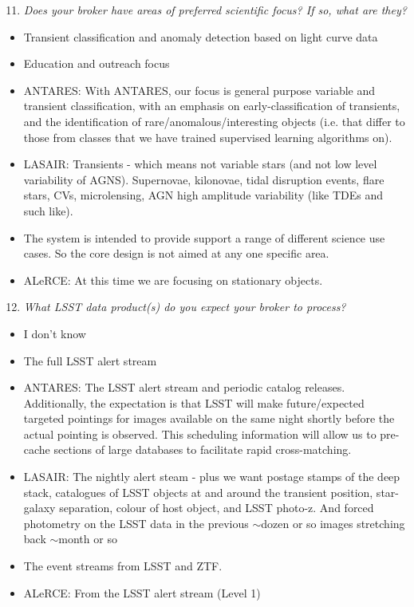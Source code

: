 \documentclass{article}
\begin{document}
\begin{enumerate}
\setcounter{enumi}{10}
\item {\em Does your broker have areas of preferred scientific focus? If so, what are they? }
\end{enumerate}

\begin{itemize}
\item Transient classification and anomaly detection based on light curve data
\item Education and outreach focus
\item ANTARES: With ANTARES, our focus is general purpose variable and transient classification, with an emphasis on early-classification of transients, and the identification of rare/anomalous/interesting objects (i.e. that differ to those from classes that we have trained supervised learning algorithms on).
\item LASAIR: Transients - which means not variable stars (and not low level variability of AGNS). Supernovae, kilonovae, tidal disruption events, flare stars, CVs, microlensing, AGN high amplitude variability (like TDEs and such like). 
\item The system is intended to provide support a range of different science use cases. So the core design is not aimed at any one specific area.
\item ALeRCE: At this time we are focusing on stationary objects.
\end{itemize}

\begin{enumerate}
\setcounter{enumi}{11}
\item {\em What LSST data product(s) do you expect your broker to process?}
\end{enumerate}

\begin{itemize}
\item I don't know
\item The full LSST alert stream
\item ANTARES: The LSST alert stream and periodic catalog releases. Additionally, the expectation is that LSST will make future/expected targeted pointings for images available on the same night shortly before the actual pointing is observed. This scheduling information will allow us to pre-cache sections of large databases to facilitate rapid cross-matching. 
\item LASAIR: The nightly alert steam - plus we want postage stamps of the deep stack, catalogues of LSST objects at and around the transient position, star-galaxy separation, colour of host object, and LSST photo-z. And forced photometry on the LSST data in the previous $\sim$dozen or so images stretching back $\sim$month or so 
\item The event streams from LSST and ZTF.
\item ALeRCE: From the LSST alert stream (Level 1)
\end{itemize}
\end{document}
